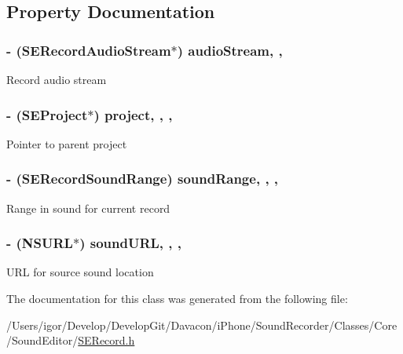 \subsection{Property Documentation}
\hypertarget{interface_s_e_record_a91d05afe5637ae3b715c600c12a78bfb}{
\subsubsection[{audio\-Stream}]{\setlength{\rightskip}{0pt plus 5cm}-\/ ({\bf S\-E\-Record\-Audio\-Stream}$\ast$) audio\-Stream\hspace{0.3cm}{\ttfamily [read]}, {\ttfamily [nonatomic]}, {\ttfamily [assign]}}}\label{interface_s_e_record_a91d05afe5637ae3b715c600c12a78bfb}
Record audio stream \hypertarget{interface_s_e_record_a6051966cb1a3a4f0dcf0e3963fc9d129}{
\subsubsection[{project}]{\setlength{\rightskip}{0pt plus 5cm}-\/ ({\bf S\-E\-Project}$\ast$) project\hspace{0.3cm}{\ttfamily [read]}, {\ttfamily [write]}, {\ttfamily [nonatomic]}, {\ttfamily [weak]}}}\label{interface_s_e_record_a6051966cb1a3a4f0dcf0e3963fc9d129}
Pointer to parent project \hypertarget{interface_s_e_record_a4d80553d0b2ad098f0bb2555bd5fea35}{
\subsubsection[{sound\-Range}]{\setlength{\rightskip}{0pt plus 5cm}-\/ ({\bf S\-E\-Record\-Sound\-Range}) sound\-Range\hspace{0.3cm}{\ttfamily [read]}, {\ttfamily [write]}, {\ttfamily [nonatomic]}, {\ttfamily [assign]}}}\label{interface_s_e_record_a4d80553d0b2ad098f0bb2555bd5fea35}
Range in sound for current record \hypertarget{interface_s_e_record_a797e448b073754b26502fce4bc47585c}{
\subsubsection[{sound\-U\-R\-L}]{\setlength{\rightskip}{0pt plus 5cm}-\/ (N\-S\-U\-R\-L$\ast$) sound\-U\-R\-L\hspace{0.3cm}{\ttfamily [read]}, {\ttfamily [write]}, {\ttfamily [nonatomic]}, {\ttfamily [strong]}}}\label{interface_s_e_record_a797e448b073754b26502fce4bc47585c}
U\-R\-L for source sound location 

The documentation for this class was generated from the following file\-:\begin{DoxyCompactItemize}
\item 
/\-Users/igor/\-Develop/\-Develop\-Git/\-Davacon/i\-Phone/\-Sound\-Recorder/\-Classes/\-Core/\-Sound\-Editor/\hyperlink{_s_e_record_8h}{S\-E\-Record.\-h}\end{DoxyCompactItemize}
